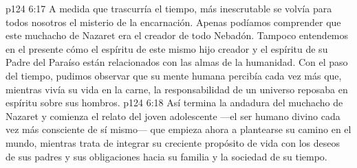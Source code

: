 \vs p124 6:17 A medida que trascurría el tiempo, más inescrutable se volvía para todos nosotros el misterio de la encarnación. Apenas podíamos comprender que este muchacho de Nazaret era el creador de todo Nebadón. Tampoco entendemos en el presente cómo el espíritu de este mismo hijo creador y el espíritu de su Padre del Paraíso están relacionados con las almas de la humanidad. Con el paso del tiempo, pudimos observar que su mente humana percibía cada vez más que, mientras vivía su vida en la carne, la responsabilidad de un universo reposaba en espíritu sobre sus hombros.
\vs p124 6:18 \pc Así termina la andadura del muchacho de Nazaret y comienza el relato del joven adolescente ---el ser humano divino cada vez más consciente de sí mismo--- que empieza ahora a plantearse su camino en el mundo, mientras trata de integrar su creciente propósito de vida con los deseos de sus padres y sus obligaciones hacia su familia y la sociedad de su tiempo.
